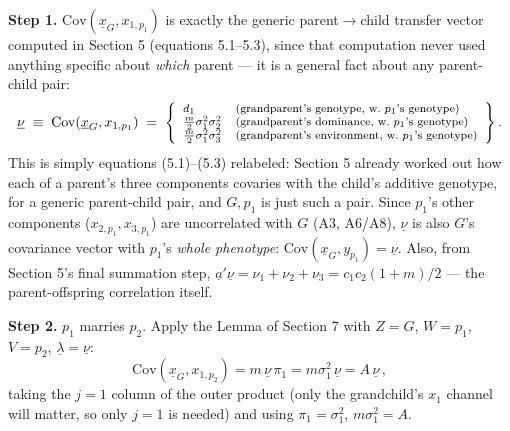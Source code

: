 \documentclass[12pt]{article}
\begin{document}
\textbf{Step 1.} $\mathrm{Cov}(\underline x_G,x_{1,p_1})$ is exactly the generic parent$\to$child transfer vector computed in Section 5 (equations 5.1--5.3), since that computation never used anything specific about \emph{which} parent — it is a general fact about any parent-child pair:
\begin{equation*}
\footnotesize
\underline\nu \;\equiv\; \mathrm{Cov}(\underline x_G,x_{1,p_1}) \;=\;
\left\{\begin{array}{ll}
d_1 & \text{(grandparent's genotype, w.\ }p_1\text{'s genotype)} \\
\tfrac{m}{2}\sigma_1^2\sigma_2^2 & \text{(grandparent's dominance, w.\ }p_1\text{'s genotype)} \\
\tfrac{m}{2}\sigma_1^2\sigma_3^2 & \text{(grandparent's environment, w.\ }p_1\text{'s genotype)}
\end{array}\right\} .
\end{equation*}
This is simply equations (5.1)--(5.3) relabeled: Section 5 already worked out how each of a parent's three components covaries with the child's additive genotype, for a generic parent-child pair, and $G,p_1$ is just such a pair.
Since $p_1$'s other components ($x_{2,p_1},x_{3,p_1}$) are uncorrelated with $G$ (A3, A6/A8), $\underline\nu$ is also $G$'s covariance vector with $p_1$'s \emph{whole phenotype}: $\mathrm{Cov}(\underline x_G,y_{p_1})=\underline\nu$. Also, from Section 5's final summation step, $\underline a'\underline\nu=\nu_1+\nu_2+\nu_3=c_1c_2(1+m)/2$ — the parent-offspring correlation itself.

\textbf{Step 2.} $p_1$ marries $p_2$. Apply the Lemma of Section 7 with $Z=G$, $W=p_1$, $V=p_2$, $\underline\lambda=\underline\nu$:
\begin{equation}
\mathrm{Cov}(\underline x_G,x_{1,p_2}) = m\,\underline\nu\,\pi_1 = m\sigma_1^2\,\underline\nu = A\,\underline\nu \, ,
\end{equation}
taking the $j=1$ column of the outer product (only the grandchild's $x_1$ channel will matter, so only $j=1$ is needed) and using $\pi_1=\sigma_1^2$, $m\sigma_1^2=A$.
\end{document}
